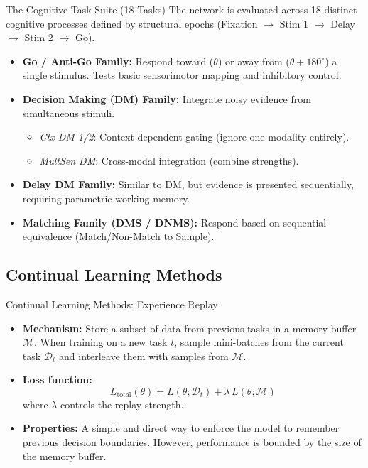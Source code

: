 \documentclass[aspectratio=169,xcolor=dvipsnames]{beamer}
\begin{document}
\begin{frame}{The Cognitive Task Suite (18 Tasks)}
	\footnotesize
	The network is evaluated across 18 distinct cognitive processes defined by structural epochs (Fixation $\rightarrow$ Stim 1 $\rightarrow$ Delay $\rightarrow$ Stim 2 $\rightarrow$ Go).
	
	\begin{itemize}
		\item \textbf{Go / Anti-Go Family:} 
		Respond toward ($\theta$) or away from ($\theta + 180^\circ$) a single stimulus. Tests basic sensorimotor mapping and inhibitory control.
		\item \textbf{Decision Making (DM) Family:} 
		Integrate noisy evidence from simultaneous stimuli.
		\begin{itemize}
			\item \textit{Ctx DM 1/2}: Context-dependent gating (ignore one modality entirely).
			\item \textit{MultSen DM}: Cross-modal integration (combine strengths).
		\end{itemize}
		\item \textbf{Delay DM Family:} 
		Similar to DM, but evidence is presented sequentially, requiring parametric working memory.
		\item \textbf{Matching Family (DMS / DNMS):} 
		Respond based on sequential equivalence (Match/Non-Match to Sample). 
	\end{itemize}
\end{frame}
	\subsection{Continual Learning Methods}
	
	\begin{frame}{Continual Learning Methods: Experience Replay}
		\begin{itemize}
			\item \textbf{Mechanism:} Store a subset of data from previous tasks in a memory buffer $\mathcal{M}$. When training on a new task $t$, sample mini-batches from the current task $\mathcal{D}_t$ and interleave them with samples from $\mathcal{M}$.
			\item \textbf{Loss function:} 
			$$ L_{\text{total}}(\theta) = L(\theta; \mathcal{D}_t) + \lambda\, L(\theta; \mathcal{M}) $$
			where $\lambda$ controls the replay strength.
			\item \textbf{Properties:} A simple and direct way to enforce the model to remember previous decision boundaries. However, performance is bounded by the size of the memory buffer.
		\end{itemize}
	\end{frame}
	
\end{document}
